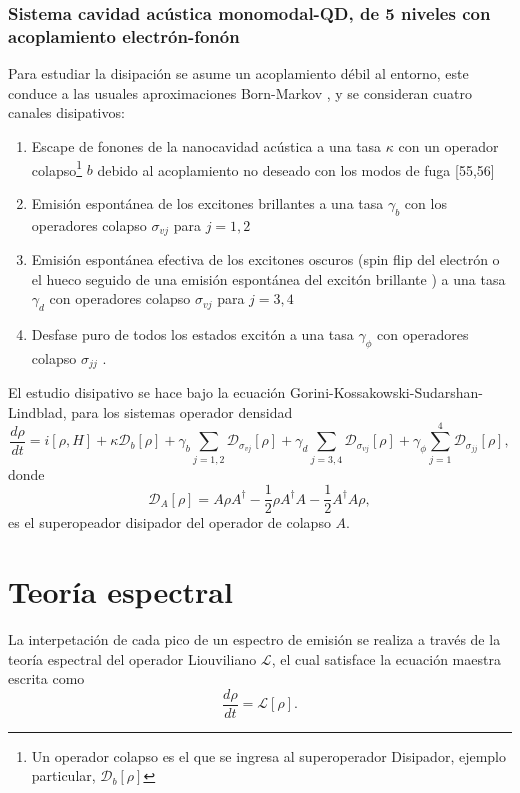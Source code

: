 \documentclass[main.tex]{subfiles}
\begin{document}
\subsubsection{Sistema cavidad acústica monomodal-QD, de 5 niveles con acoplamiento electrón-fonón}
Para estudiar la disipación se asume un acoplamiento débil al entorno, este conduce a las usuales aproximaciones Born-Markov \parencite{Breuer2007}, y se consideran cuatro canales disipativos:
\begin{enumerate}
	\item Escape de fonones de la nanocavidad acústica a una tasa $\kappa$ con un operador colapso\footnote{Un operador colapso es el que se ingresa al superoperador Disipador, ejemplo particular, $\mathcal{D}_b[\rho]$} $b$ debido al acoplamiento no deseado con los modos de fuga [55,56]
	\item Emisión espontánea de los excitones brillantes a una tasa $\gamma_b$ con los operadores colapso $\sigma_{vj}$ para $j=1,2$
	\item Emisión espontánea efectiva de los excitones oscuros (spin flip del electrón o el hueco seguido de una emisión espontánea del excitón brillante \parencite{Crooker2003}) a una tasa $\gamma_d$ con operadores colapso $\sigma_{vj}$ para $j=3,4$
	\item Desfase puro de todos los estados excitón a una tasa $\gamma_\phi$ con operadores colapso $\sigma_{jj}$ \parencite{Takagahara2002}.
\end{enumerate}

El estudio disipativo se hace bajo la ecuación Gorini-Kossakowski-Sudarshan-Lindblad, para los sistemas operador densidad
\begin{equation}\label{eq:dissipativeMasterEquation}
	\frac{d\rho}{dt} = i[\rho,H] + \kappa \mathcal{D}_b[\rho] + \gamma_b \sum_{j=1,2} \mathcal{D}_{\sigma_{vj}}[\rho] + \gamma_d \sum_{j=3,4} \mathcal{D}_{\sigma_{vj}}[\rho] + \gamma_\phi \sum_{j=1}^4 \mathcal{D}_{\sigma_{jj}}[\rho],
\end{equation}
donde
\begin{equation}
	\mathcal{D}_A[\rho] = A\rho A^\dagger - \frac{1}{2} \rho A^\dagger A - \frac{1}{2} A^\dagger A \rho,
\end{equation}
es el superopeador disipador del operador de colapso $A$.

\section{Teoría espectral}\label{sec:spectralTheory}
La interpetación de cada pico de un espectro de emisión se realiza a través de la teoría espectral del operador Liouviliano $\mathcal{L}$, el cual satisface la ecuación maestra escrita como \parencite{Manzano2018}
\begin{equation}
	\frac{d\rho}{dt} = \mathcal{L}[\rho].
\end{equation}
\end{document}
